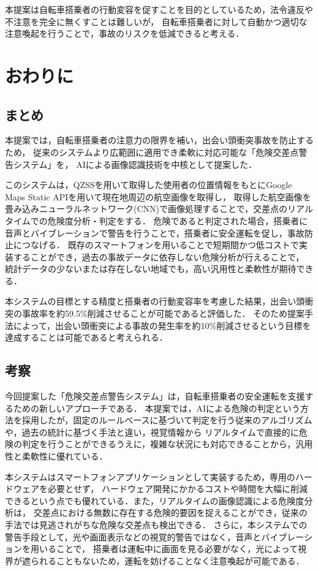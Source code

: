 \documentclass[uplatex,dvipdfmx]{jsarticle}
\begin{document}
本提案は自転車搭乗者の行動変容を促すことを目的としているため，法令違反や不注意を完全に無くすことは難しいが，
自転車搭乗者に対して自動かつ適切な注意喚起を行うことで，事故のリスクを低減できると考える．

\section{おわりに}
\subsection{まとめ}
本提案では，自転車搭乗者の注意力の限界を補い，出会い頭衝突事故を防止するため，
従来のシステムより広範囲に適用でき柔軟に対応可能な「危険交差点警告システム」を，
AIによる画像認識技術を中核として提案した．

このシステムは，QZSSを用いて取得した使用者の位置情報をもとにGoogle Maps Static APIを用いて現在地周辺の航空画像を取得し，
取得した航空画像を畳み込みニューラルネットワーク(CNN)で画像処理することで，交差点のリアルタイムでの危険度分析・判定をする．
危険であると判定された場合，搭乗者に音声とバイブレーションで警告を行うことで，搭乗者に安全運転を促し，事故防止につなげる．
既存のスマートフォンを用いることで短期間かつ低コストで実装することができ，過去の事故データに依存しない危険分析が行えることで，
統計データの少ないまたは存在しない地域でも，高い汎用性と柔軟性が期待できる．

本システムの目標とする精度と搭乗者の行動変容率を考慮した結果，出会い頭衝突の事故率を約59.5\%削減させることが可能であると評価した．
そのため提案手法によって，出会い頭衝突による事故の発生率を約10\%削減させるという目標を達成することは可能であると考えられる．

\subsection{考察}
今回提案した「危険交差点警告システム」は，自転車搭乗者の安全運転を支援するための新しいアプローチである．
本提案では，AIによる危険の判定という方法を採用したが，固定のルールベースに基づいて判定を行う従来のアルゴリズムや，過去の統計に基づく手法と違い，視覚情報から
リアルタイムで直接的に危険の判定を行うことができるうえに，複雑な状況にも対応できることから，汎用性と柔軟性に優れている．

本システムはスマートフォンアプリケーションとして実装するため，専用のハードウェアを必要とせず，
ハードウェア開発にかかるコストや時間を大幅に削減できるという点でも優れている．また，リアルタイムの画像認識による危険度分析は，
交差点における無数に存在する危険的要因を捉えることができ，従来の手法では見逃されがちな危険な交差点も検出できる．
さらに，本システムでの警告手段として，光や画面表示などの視覚的警告ではなく，音声とバイブレーションを用いることで，
搭乗者は運転中に画面を見る必要がなく，光によって視界が遮られることもないため，運転を妨げることなく注意喚起が可能である．
\end{document}
